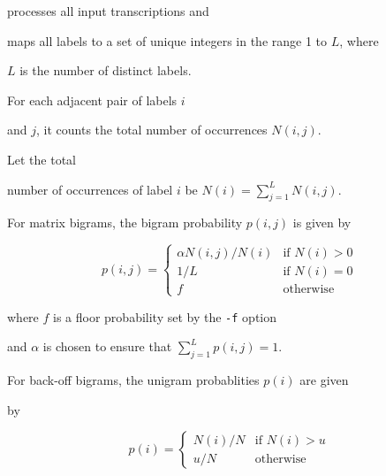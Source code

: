  processes all input transcriptions and


maps all labels to a set of unique integers in the range 1 to $L$, where


$L$ is the number of distinct labels.  


For each adjacent pair of labels $i$


and $j$, it counts the total number of occurrences $N(i,j)$.


Let the total


number of occurrences of label $i$ be $N(i) = \sum_{j=1}^L N(i,j)$.





For matrix bigrams, the bigram probability $p(i,j)$ is given by


\[


   p(i,j) = \left\{


      \begin{array}{ll}


           \alpha N(i,j)/N(i) & \mbox{if $N(i) > 0$} \\


           1/L & \mbox{if $N(i) = 0$} \\


           f   & \mbox{otherwise}


       \end{array}


   \right. 


\]


where $f$ is a floor probability set by the \texttt{-f} option


and $\alpha$ is chosen to ensure that $\sum_{j=1}^L p(i,j) = 1$.





For back-off bigrams, the unigram probablities $p(i)$ are given


by


\[


   p(i) = \left\{


      \begin{array}{ll}


           N(i)/N & \mbox{if $N(i) > u$} \\


                   u/N   & \mbox{otherwise}


       \end{array}


   \right. 


\]



